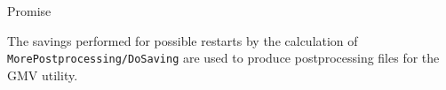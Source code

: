        {Promise} \\


The savings performed for possible restarts by the
calculation of \verb+MorePostprocessing/DoSaving+
are used to produce postprocessing files for
the GMV utility.

